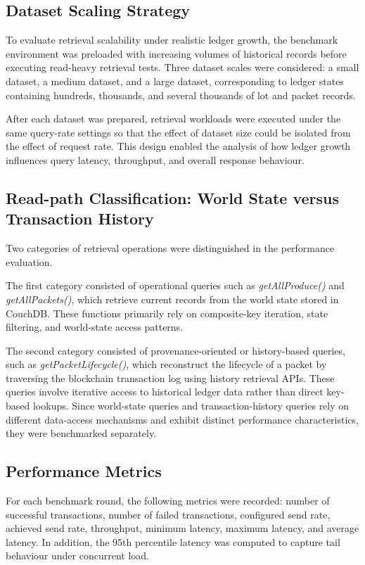 \documentclass[12pt]{article}
\begin{document}
	
	\subsection{Dataset Scaling Strategy}
	
	To evaluate retrieval scalability under realistic ledger growth, the benchmark environment was preloaded with increasing volumes of historical records before executing read-heavy retrieval tests. Three dataset scales were considered: a small dataset, a medium dataset, and a large dataset, corresponding to ledger states containing hundreds, thousands, and several thousands of lot and packet records.
	
	After each dataset was prepared, retrieval workloads were executed under the same query-rate settings so that the effect of dataset size could be isolated from the effect of request rate. This design enabled the analysis of how ledger growth influences query latency, throughput, and overall response behaviour. 
	
	\subsection{Read-path Classification: World State versus Transaction History}
	
	Two categories of retrieval operations were distinguished in the performance evaluation.
	
	The first category consisted of operational queries such as \textit{getAllProduce()} and 
	\textit{getAllPackets()}, which retrieve current records from the world state stored in CouchDB. These functions primarily rely on composite-key iteration, state filtering, and world-state access patterns.
	
	The second category consisted of provenance-oriented or history-based queries, such as \textit{getPacketLifecycle()}, which reconstruct the lifecycle of a packet by traversing the blockchain transaction log using history retrieval APIs. These queries involve iterative access to historical ledger data rather than direct key-based lookups. Since world-state queries and transaction-history queries rely on different data-access mechanisms and exhibit distinct performance characteristics, they were benchmarked separately.
	
	\subsection{Performance Metrics}
	
	For each benchmark round, the following metrics were recorded: number of successful transactions, number of failed transactions, configured send rate, achieved send rate, throughput, minimum latency, maximum latency, and average latency. In addition, the 95th percentile latency was computed to capture tail behaviour under concurrent load.
	
\end{document}
